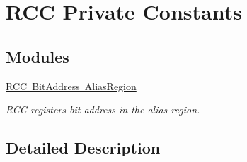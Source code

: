 \hypertarget{group___r_c_c___private___constants}{}\section{R\+CC Private Constants}
\label{group___r_c_c___private___constants}
\subsection*{Modules}
\begin{DoxyCompactItemize}
\item 
\mbox{\hyperlink{group___r_c_c___bit_address___alias_region}{R\+C\+C Bit\+Address Alias\+Region}}
\begin{DoxyCompactList}\small\item\em R\+CC registers bit address in the alias region. \end{DoxyCompactList}\end{DoxyCompactItemize}


\subsection{Detailed Description}
